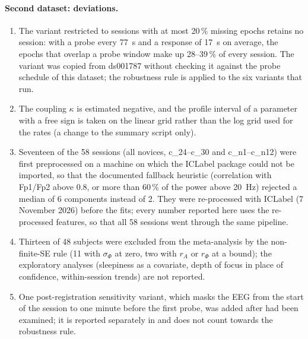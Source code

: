 \documentclass[12pt,a4paper]{article}
\theoremstyle{plain}
\theoremstyle{definition}
\theoremstyle{remark}
\newcommand{\sPhi}{\sigma_{\Phi}}
\newcommand{\rA}{r_{A}}
\newcommand{\rPhi}{r_{\Phi}}
\begin{document}
\paragraph{Second dataset: deviations.}
\begin{enumerate}[label=(\roman*)]
  \item The variant restricted to sessions with at most 20\,\% missing epochs retains no session: with a probe every 77~s and a response of 17~s on average, the epochs that overlap a probe window make up 28--39\,\% of every session. The variant was copied from ds001787 without checking it against the probe schedule of this dataset; the robustness rule is applied to the six variants that run.
  \item The coupling $\kappa$ is estimated negative, and the profile interval of a parameter with a free sign is taken on the linear grid rather than the log grid used for the rates (a change to the summary script only).
  \item Seventeen of the 58 sessions (all novices, c\_24--c\_30 and c\_n1--c\_n12) were first preprocessed on a machine on which the ICLabel package could not be imported, so that the documented fallback heuristic (correlation with Fp1/Fp2 above 0.8, or more than 60\,\% of the power above 20~Hz) rejected a median of 6 components instead of 2. They were re-processed with ICLabel (7 November 2026) before the fits; every number reported here uses the re-processed features, so that all 58 sessions went through the same pipeline.
  \item Thirteen of 48 subjects were excluded from the meta-analysis by the non-finite-SE rule (11 with $\sPhi$ at zero, two with $\rA$ or $\rPhi$ at a bound); the exploratory analyses (sleepiness as a covariate, depth of focus in place of confidence, within-session trends) are not reported.
  \item One post-registration sensitivity variant, which masks the EEG from the start of the session to one minute before the first probe, was added after  had been examined; it is reported separately in  and does not count towards the robustness rule.
\end{enumerate}
\end{document}
